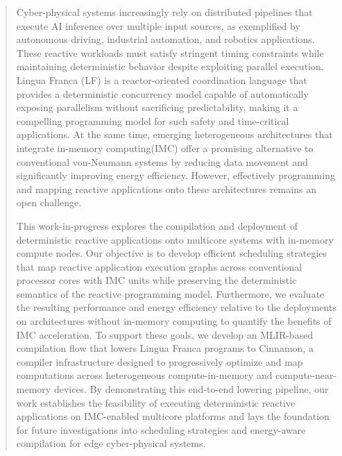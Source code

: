 \documentclass[journal,onecolumn,12pt]{IEEEtran}
\begin{document}
\begin{abstract}

Cyber-physical systems increasingly rely on distributed pipelines that execute AI inference over multiple input sources, as exemplified by autonomous driving, industrial automation, and robotics applications. These reactive workloads must satisfy stringent timing constraints while maintaining deterministic behavior despite exploiting parallel execution. Lingua Franca (LF)\cite{10.1145/3448128} is a reactor-oriented coordination language that provides a deterministic concurrency model capable of automatically exposing parallelism without sacrificing predictability, making it a compelling programming model for such safety and time-critical applications. At the same time, emerging heterogeneous architectures that integrate in-memory computing(IMC) offer a promising alternative to conventional von-Neumann systems by reducing data movement and significantly improving energy efficiency. However, effectively programming and mapping reactive applications onto these architectures remains an open challenge.

This work-in-progress explores the compilation and deployment of deterministic reactive applications onto multicore systems with in-memory compute nodes. Our objective is to develop efficient scheduling strategies that map reactive application execution graphs across conventional processor cores with IMC units\cite{10.1109/TC.2022.3230285} while preserving the deterministic semantics of the reactive programming model. Furthermore, we evaluate the resulting performance and energy efficiency relative to the deployments on architectures without in-memory computing to quantify the benefits of IMC acceleration. To support these goals, we develop an MLIR-based compilation flow that lowers Lingua Franca programs to Cinnamon\cite{10.1145/3622781.3674189}, a compiler infrastructure designed to progressively optimize and map computations across heterogeneous compute-in-memory and compute-near-memory devices. By demonstrating this end-to-end lowering pipeline, our work establishes the feasibility of executing deterministic reactive applications on IMC-enabled multicore platforms and lays the foundation for future investigations into scheduling strategies and energy-aware compilation for edge cyber-physical systems.

\end{abstract}



\end{document}
